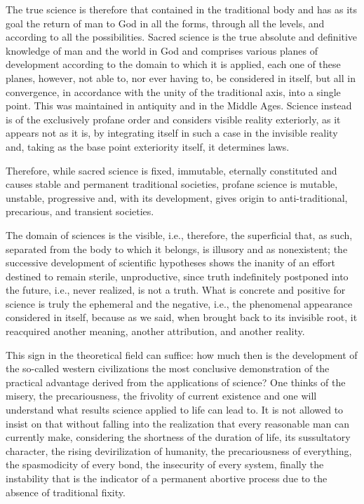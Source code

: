 The true science is therefore that contained in the traditional body and has as its goal the return of man to God in all the forms, through all the levels, and according to all the possibilities. Sacred science is the true absolute and definitive knowledge of man and the world in God and comprises various planes of development according to the domain to which it is applied, each one of these planes, however, not able to, nor ever having to, be considered in itself, but all in convergence, in accordance with the unity of the traditional axis, into a single point. This was maintained in antiquity and in the Middle Ages. Science instead is of the exclusively profane order and considers visible reality exteriorly, as it appears not as it is, by integrating itself in such a case in the invisible reality and, taking as the base point exteriority itself, it determines laws.

Therefore, while sacred science is fixed, immutable, eternally constituted and causes stable and permanent traditional societies, profane science is mutable, unstable, progressive and, with its development, gives origin to anti-traditional, precarious, and transient societies.

The domain of sciences is the visible, i.e., therefore, the superficial that, as such, separated from the body to which it belongs, is illusory and as nonexistent; the successive development of scientific hypotheses shows the inanity of an effort destined to remain sterile, unproductive, since truth indefinitely postponed into the future, i.e., never realized, is not a truth. What is concrete and positive for science is truly the ephemeral and the negative, i.e., the phenomenal appearance considered in itself, because as we said, when brought back to its invisible root, it reacquired another meaning, another attribution, and another reality.

This sign in the theoretical field can suffice: how much then is the development of the so-called western civilizations the most conclusive demonstration of the practical advantage derived from the applications of science? One thinks of the misery, the precariousness, the frivolity of current existence and one will understand what results science applied to life can lead to. It is not allowed to insist on that without falling into the realization that every reasonable man can currently make, considering the shortness of the duration of life, its sussultatory character, the rising devirilization of humanity, the precariousness of everything, the spasmodicity of every bond, the insecurity of every system, finally the instability that is the indicator of a permanent abortive process due to the absence of traditional fixity.

